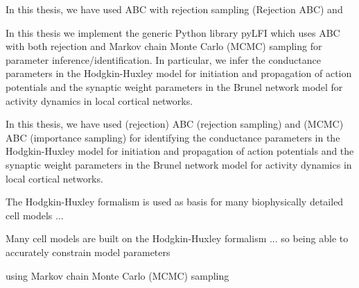 In this thesis, we have used ABC with rejection sampling (Rejection ABC) and

In this thesis we implement the generic Python library pyLFI which uses ABC with both rejection and Markov chain Monte Carlo (MCMC) sampling for parameter inference/identification. In particular, we infer the conductance parameters in the Hodgkin-Huxley model for initiation and propagation of action potentials and the synaptic weight parameters in the Brunel network model for activity dynamics in local cortical networks. 

In this thesis, we have used (rejection) ABC (rejection sampling) and (MCMC) ABC (importance sampling) for identifying the conductance parameters in the Hodgkin-Huxley model for initiation and propagation of action potentials and the synaptic weight parameters in the Brunel network model for activity dynamics in local cortical networks. 

The Hodgkin-Huxley formalism is used as basis for many biophysically detailed cell models ...

Many cell models are built on the Hodgkin-Huxley formalism ... so being able to accurately constrain model parameters

using Markov chain Monte Carlo (MCMC) sampling





